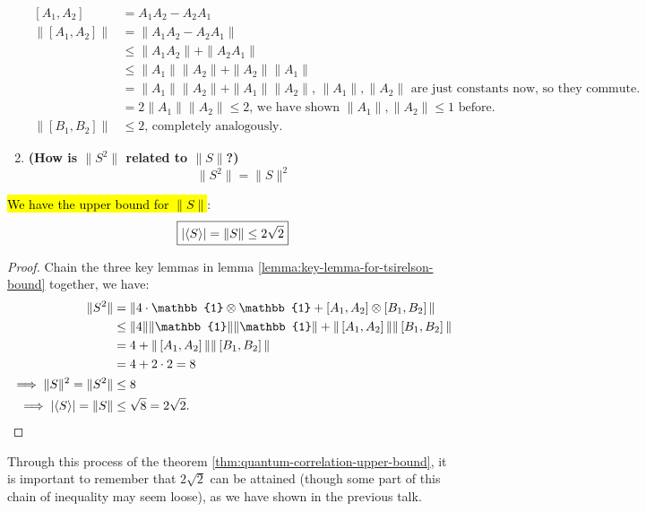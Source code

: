 \documentclass[12pt]{article}
\begin{document}
\begin{lemma}
\begin{enumerate}
$$\begin{aligned}
    [A_1, A_2]
        &= A_1 A_2 - A_2 A_1\\
    \boxed{\|[A_1, A_2]\|}
        &= \|A_1 A_2 - A_2 A_1\|\\
        &\leq \|A_1 A_2\| + \|A_2 A_1\|\\
        &\leq \|A_1\| \|A_2\| + \|A_2\| \|A_1\|\\
        &= \|A_1\|\|A_2\| + \|A_1\|\|A_2\| \text{, $\|A_1\|, \|A_2\|$ are just constants now, so they commute.}\\
        &= 2\|A_1\|\|A_2\| \boxed{\leq 2}\text{, we have shown $\|A_1\|, \|A_2\|\leq 1$ before.}\\
    \boxed{\|[B_1, B_2]\|}
        &\boxed{\leq 2}\text{, completely analogously.}
    \end{aligned}
    $$
    \item \textbf{(How is $\|S^2\|$ related to $\|S\|$?)} $$
    \boxed{\|S^2\| = \|S\|^2}
    $$
\end{enumerate}
\end{lemma}

\begin{theorem}\label{thm:quantum-correlation-upper-bound}
\hl{We have the upper bound for $\|S\|$}: $$
\boxed{|\langle S\rangle| = \|S\| \leq 2\sqrt{2}}
$$
\end{theorem}
\begin{proof}
Chain the three key lemmas in lemma \ref{lemma:key-lemma-for-tsirelson-bound} together, we have: $$
\begin{aligned}
\|S^2\| 
    &= \|4\cdot \mathbb{1}\otimes \mathbb{1} + \sprt{A_1, A_2}\otimes \sprt{B_1, B_2}\| \\
    &\leq \|4\|\|\mathbb{1}\|\|\mathbb{1}\| + \|\sprt{A_1, A_2}\|\|\sprt{B_1, B_2}\|\\
    &= 4 + \|\sprt{A_1, A_2}\|\|\sprt{B_1, B_2}\| \\
    &= 4 + 2\cdot 2 = 8\\
\implies
\|S\|^2 = \|S^2\|
    &\leq 8\\
\implies
|\lr{S}| = \|S\|
    &\leq \sqrt{8} = 2\sqrt{2}.
\end{aligned}
$$
\end{proof}

\begin{remark}
Through this process of the theorem \ref{thm:quantum-correlation-upper-bound}, it is important to remember that $2\sqrt{2}$ can be attained (though some part of this chain of inequality may seem loose), as we have shown in the previous talk.
\end{remark}
\end{document}
